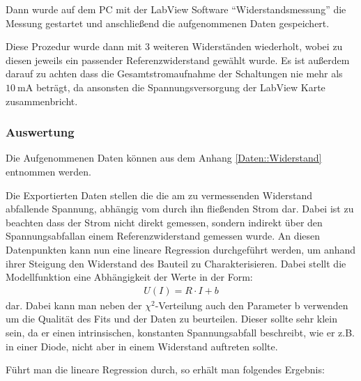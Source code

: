 \documentclass[12pt,twoside,a4paper]{scrartcl}
\begin{document}
				Dann wurde auf dem PC mit der LabView Software ``Widerstandsmessung'' die Messung gestartet und anschließend die aufgenommenen Daten gespeichert.

				Diese Prozedur wurde dann mit 3 weiteren Widerständen wiederholt, wobei zu diesen jeweils ein passender Referenzwiderstand gewählt wurde.
				Es ist außerdem darauf zu achten dass die Gesamtstromaufnahme der Schaltungen nie mehr als $\SI{10}{\milli \ampere}$ beträgt, da ansonsten die Spannungsversorgung der LabView Karte zusammenbricht.

			\subsubsection{Auswertung}

				Die Aufgenommenen Daten können aus dem Anhang \ref{Daten::Widerstand} entnommen werden.

				Die Exportierten Daten stellen die die am zu vermessenden Widerstand abfallende Spannung, abhängig vom durch ihn fließenden Strom dar. Dabei ist zu beachten dass der Strom nicht direkt gemessen, sondern indirekt über den Spannungsabfallan einem Referenzwiderstand gemessen wurde. An diesen Datenpunkten kann nun eine lineare Regression durchgeführt werden, um anhand ihrer Steigung den Widerstand des Bauteil zu Charakterisieren. Dabei stellt die Modellfunktion eine Abhängigkeit der Werte in der Form:
				\begin{align*}
					U(I) = R \cdot I + b
				\end{align*}
				dar. Dabei kann man neben der $\chi^2$-Verteilung auch den Parameter b verwenden um die Qualität des Fits und der Daten zu beurteilen. Dieser sollte sehr klein sein, da er einen intrinsischen, konstanten Spannungsabfall beschreibt, wie er z.B. in einer Diode, nicht aber in einem Widerstand auftreten sollte.

				Führt man die lineare Regression durch, so erhält man folgendes Ergebnis:
\end{document}
